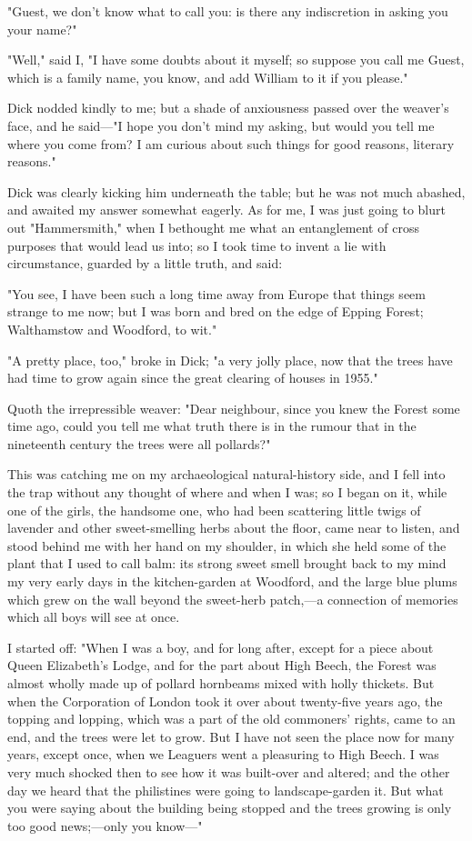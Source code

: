 "Guest, we don't know what to call you: is there any indiscretion in
asking you your name?"

"Well," said I, "I have some doubts about it myself; so suppose you call
me Guest, which is a family name, you know, and add William to it if you
please."

Dick nodded kindly to me; but a shade of anxiousness passed over the
weaver's face, and he said---"I hope you don't mind my asking, but would
you tell me where you come from? I am curious about such things for good
reasons, literary reasons."

Dick was clearly kicking him underneath the table; but he was not much
abashed, and awaited my answer somewhat eagerly. As for me, I was just
going to blurt out "Hammersmith," when I bethought me what an
entanglement of cross purposes that would lead us into; so I took time
to invent a lie with circumstance, guarded by a little truth, and said:

"You see, I have been such a long time away from Europe that things seem
strange to me now; but I was born and bred on the edge of Epping Forest;
Walthamstow and Woodford, to wit."

"A pretty place, too," broke in Dick; "a very jolly place, now that the
trees have had time to grow again since the great clearing of houses in
1955."

Quoth the irrepressible weaver: "Dear neighbour, since you knew the
Forest some time ago, could you tell me what truth there is in the
rumour that in the nineteenth century the trees were all pollards?"

This was catching me on my archaeological natural-history side, and I
fell into the trap without any thought of where and when I was; so I
began on it, while one of the girls, the handsome one, who had been
scattering little twigs of lavender and other sweet-smelling herbs about
the floor, came near to listen, and stood behind me with her hand on my
shoulder, in which she held some of the plant that I used to call balm:
its strong sweet smell brought back to my mind my very early days in the
kitchen-garden at Woodford, and the large blue plums which grew on the
wall beyond the sweet-herb patch,---a connection of memories which all
boys will see at once.

I started off: "When I was a boy, and for long after, except for a piece
about Queen Elizabeth's Lodge, and for the part about High Beech, the
Forest was almost wholly made up of pollard hornbeams mixed with holly
thickets. But when the Corporation of London took it over about
twenty-five years ago, the topping and lopping, which was a part of the
old commoners' rights, came to an end, and the trees were let to grow.
But I have not seen the place now for many years, except once, when we
Leaguers went a pleasuring to High Beech. I was very much shocked then
to see how it was built-over and altered; and the other day we heard
that the philistines were going to landscape-garden it. But what you
were saying about the building being stopped and the trees growing is
only too good news;---only you know---"

